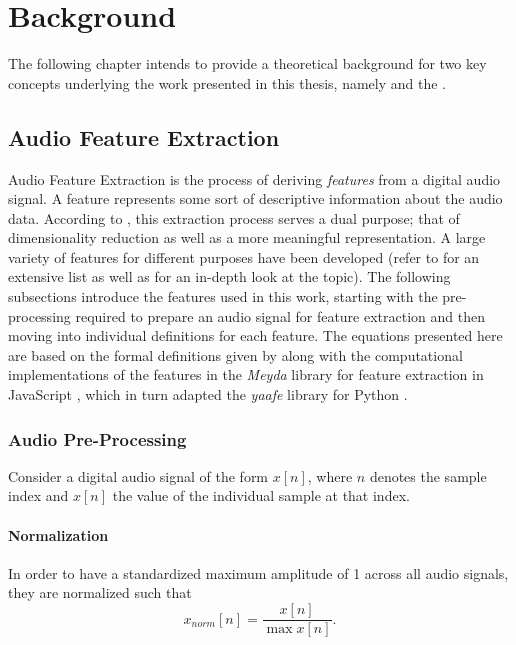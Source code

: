 
\section{Background}
\label{sec:background}
The following chapter intends to provide a theoretical background for two key
concepts underlying the work presented in this thesis, namely
 and the .

\subsection{Audio Feature Extraction}
\label{subsec:feature_extraction}
Audio Feature Extraction is the process of deriving \textit{features} from a
digital audio signal. A feature represents some sort of descriptive information
about the audio data. According to \citet{lerch2012}, this extraction process
serves a dual purpose; that of dimensionality reduction as well as a more
meaningful representation. A large variety of features for different purposes
have been developed (refer to \citet{peeters2004} for an extensive list as well
as \citet{lerch2012} for an in-depth look at the topic). The following
subsections introduce the features used in this work, starting with the pre-processing required to prepare an audio signal for feature extraction and then
moving into individual definitions for each feature. The equations presented
here are based on the formal definitions given by \citet{lerch2012} along with
the computational implementations of the features in the \textit{Meyda} library
for feature extraction in JavaScript \citep{rawlinson2015}, which in turn
adapted the \textit{yaafe} library for Python \citep{mathieu2010}.

\subsubsection{Audio Pre-Processing}
\label{subsubsec:preprocessing}
Consider a digital audio signal of the form $x[n]$, where $n$ denotes the sample
index and $x[n]$ the value of the individual sample at that index.

\paragraph{Normalization}
\label{para:normalization}
In order to have a standardized maximum amplitude of 1 across all audio signals,
they are normalized such that
\begin{equation}
  x_{norm}[n] = \frac{x[n]}{\max{x[n]}}.
\end{equation}

